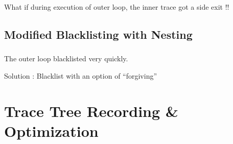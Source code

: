 \documentclass[mathserif,10pt]{beamer}
\newcommand{\cmt}[1]{}
\begin{document}
\frame
{
  \frametitle{\subsecname}
  \begin{figure}[h]
  \centering
  \end{figure}

  What if during execution of outer loop, the inner trace got a side exit !!
}
\subsection{Modified Blacklisting with Nesting}
\frame
{
  \frametitle{\subsecname}
  \begin{itemize}
   \item  The outer loop blacklisted very quickly.
    { \item Solution : Blacklist with an option of ``forgiving''  }
   \end{itemize}
}
               \cmt{ as the inner loop not available or takes side exit
   Solution : Increment blacklist counter on such aborts, and backoff on compiling it,  but decrement it when the inner loop
     succesfully finishes a trace and undo the backoff.
               }

\section{Trace Tree Recording \& Optimization}
\end{document}
